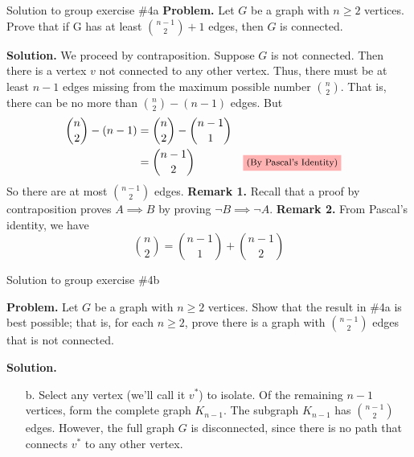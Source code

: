 \documentclass[10pt]{beamer}
\begin{document}
\begin{frame}{Solution to group exercise \#4a}
\small 
\textbf{Problem.} Let $G$ be a graph with $n \geq 2$ vertices.   Prove that if G has at least $\binom{n-1}{2} +1$ edges, then $G$ is connected.
\vfill 

\textbf{Solution.}
 We proceed \colorbox{green!30}{by contraposition}.  Suppose $G$ is not connected. Then there is a vertex $v$ not connected to any other vertex.  Thus, there must be at least $n-1$ edges missing from the maximum possible number $\binom{n}{2}$.  That is, there can be no more than $\binom{n}{2} - (n-1)$ edges.  But
    \begin{align*}
    \binom{n}{2} - (n-1) &= 	 \binom{n}{2} -   \binom{n-1}{1} \\
    &= \binom{n-1}{2} && \text{\colorbox{red!30}{\footnotesize{(By Pascal's Identity)}}}
    \end{align*}
    So there are at most $\binom{n-1}{2}$ edges.
\vfill 
\colorbox{green!30}{\textbf{Remark 1.}} Recall that a \colorbox{green!30}{proof by contraposition} proves $A \implies B$ by proving $\lnot B \implies \lnot A$.
\vfill 
\colorbox{red!30}{\textbf{Remark 2.}} From \colorbox{red!30}{Pascal's identity}, we have
\[\binom{n}{2} = \binom{n-1}{1}  + \binom{n-1}{2}  \]
\end{frame}

\begin{frame}{Solution to group exercise \#4b}

\textbf{Problem.} Let $G$ be a graph with $n \geq 2$ vertices.  Show that the result in \#4a is best possible; that is, for each $n \geq 2$, prove there is a graph with 	$\binom{n-1}{2}$ edges that is not connected.
\vfill 

\textbf{Solution.}
    \begin{itemize}
        \item[b.] Select any vertex (we'll call it $v^*$) to isolate.  Of the remaining $n-1$ vertices, form the complete graph $K_{n-1}$.  The subgraph $K_{n-1}$ has $\binom{n-1}{2}$ edges.  However, the full graph $G$ is disconnected, since there is no path that connects $v^*$ to any other vertex.  
    \end{itemize}
\end{frame}
\end{document}
